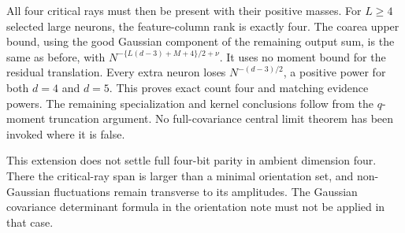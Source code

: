 \documentclass[11pt]{article}
\begin{document}
All four critical rays must then be present with their positive masses.
For $L\ge4$ selected large neurons, the feature-column rank is exactly
four. The coarea upper bound, using the good Gaussian component of the
remaining output sum, is the same as before, with
$N^{-\{L(d-3)+M+4\}/2+\nu}$. It uses no moment bound for the residual
translation. Every extra neuron loses $N^{-(d-3)/2}$, a positive power
for both $d=4$ and $d=5$. This proves exact count four and matching
evidence powers. The remaining specialization and kernel conclusions
follow from the $q$-moment truncation argument. No full-covariance central
limit theorem has been invoked where it is false.

This extension does not settle full four-bit parity in ambient dimension
four. There the critical-ray span is larger than a minimal orientation
set, and non-Gaussian fluctuations remain transverse to its amplitudes.
The Gaussian covariance determinant formula in the orientation note
must not be applied in that case.
\end{document}
